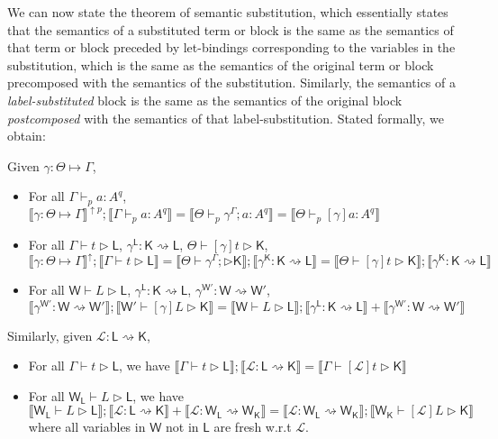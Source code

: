 \documentclass[acmsmall,screen,review]{acmart}
\newcommand{\mc}[1]{\ensuremath{\mathcal{#1}}}
\newcommand{\ms}[1]{\ensuremath{\mathsf{#1}}}
\newcommand{\hasty}[5]{#1 \vdash_{#2} #3: {#4}^{#5}}
\newcommand{\haslb}[3]{#1 \vdash #2 \rhd #3}
\newcommand{\lhaslb}[3]{#1 \vdash #2 \rhd #3}
\newcommand{\issubst}[3]{#1: #2 \mapsto #3}
\newcommand{\lbsubst}[3]{#1: #2 \rightsquigarrow #3}
\newcommand{\exprletsubst}[2]{{#1};{#2}}
\newcommand{\substctx}[2]{{#1}^{#2}}
\newcommand{\substlbs}[2]{{#1}^{#2}}
\newcommand{\dnt}[1]{\llbracket{#1}\rrbracket}
\newcommand{\upg}[2]{{#1}^{\uparrow #2}}
\begin{document}
We can now state the theorem of semantic substitution, which essentially states
that the semantics of a substituted term or block is the same as the semantics
of that term or block preceded by let-bindings corresponding to the variables in
the substitution, which is the same as the semantics of the original term or
block precomposed with the semantics of the substitution. Similarly, the
semantics of a \textit{label-substituted} block is the same as the semantics of
the original block \textit{postcomposed} with the semantics of that
label-substitution. Stated formally, we obtain:
\begin{theorem} 
  Given \(\issubst{\gamma}{\Theta}{\Gamma}\),
  \begin{itemize}
    \item For all \(\hasty{\Gamma}{p}{a}{A}{q}\), 
    \(
      \upg{\dnt{\issubst{\gamma}{\Theta}{\Gamma}}}{p}
      ;\dnt{\hasty{\Gamma}{p}{a}{A}{q}} 
      = \dnt{\hasty{\Theta}{p}{\exprletsubst{\substctx{\gamma}{\Gamma}}{a}}{A}{q}}
      = \dnt{\hasty{\Theta}{p}{[\gamma]a}{A}{q}}
    \)
    \item For all 
      \(\haslb{\Gamma}{t}{\ms{L}}\), 
      \(\lbsubst{\substlbs{\gamma}{\ms{L}}}{\ms{K}}{\ms{L}}\), 
      \(\haslb{\Theta}{[\gamma]t}{\ms{K}}\),
    \[
      \upg{\dnt{\issubst{\gamma}{\Theta}{\Gamma}}}{}
      ; \dnt{\haslb{\Gamma}{t}{\ms{L}}}
      = \dnt{\haslb{\Theta}{\exprletsubst{\substctx{\gamma}{\Gamma}}}{\ms{K}}} 
      ; \dnt{\lbsubst{\substlbs{\gamma}{\ms{K}}}{\ms{K}}{\ms{L}}}
      = \dnt{\haslb{\Theta}{[\gamma]t}{\ms{K}}} 
      ; \dnt{\lbsubst{\substlbs{\gamma}{\ms{K}}}{\ms{K}}{\ms{L}}}
    \]
    \item For all 
      \(\lhaslb{\ms{W}}{L}{\ms{L}}\), 
      \(\lbsubst{\substlbs{\gamma}{\ms{L}}}{\ms{K}}{\ms{L}}\),
      \(\lbsubst{\substlbs{\gamma}{\ms{W'}}}{\ms{W}}{\ms{W'}}\),
      \[
        \dnt{\lbsubst{\substlbs{\gamma}{\ms{W'}}}{\ms{W}}{\ms{W'}}}
        ; \dnt{\lhaslb{\ms{W'}}{[\gamma]L}{\ms{K}}}
        = \dnt{\lhaslb{\ms{W}}{L}{\ms{L}}}
        ; \dnt{\lbsubst{\substlbs{\gamma}{\ms{L}}}{\ms{K}}{\ms{L}}}
        + \dnt{\lbsubst{\substlbs{\gamma}{\ms{W'}}}{\ms{W}}{\ms{W'}}}
      \]
  \end{itemize}  
  Similarly, given \(\lbsubst{\mc{L}}{\ms{L}}{\ms{K}}\),
  \begin{itemize} 
    \item For all \(\haslb{\Gamma}{t}{\ms{L}}\), we have
    \(
      \dnt{\haslb{\Gamma}{t}{\ms{L}}};\dnt{\lbsubst{\mc{L}}{\ms{L}}{\ms{K}}}
      = \dnt{\haslb{\Gamma}{[\mc{L}]t}{\ms{K}}}
    \)
    \item For all \(\lhaslb{\ms{W}_{\ms{L}}}{L}{\ms{L}}\), we have
    \[
      \dnt{\lhaslb{\ms{W}_{\ms{L}}}{L}{\ms{L}}};\dnt{\lbsubst{\mc{L}}{\ms{L}}{\ms{K}}}
      + \dnt{\lbsubst{\mc{L}}{\ms{W}_{\ms{L}}}{\ms{W}_{\ms{K}}}}
      = \dnt{\lbsubst{\mc{L}}{\ms{W}_{\ms{L}}}{\ms{W}_{\ms{K}}}};\dnt{\lhaslb{\ms{W}_{\ms{K}}}{[\mc{L}]L}{\ms{K}}}
    \]
    where all variables in \(\ms{W}\) not in \(\ms{L}\) are fresh w.r.t \(\mc{L}\).
  \end{itemize}
\end{theorem}
\end{document}
